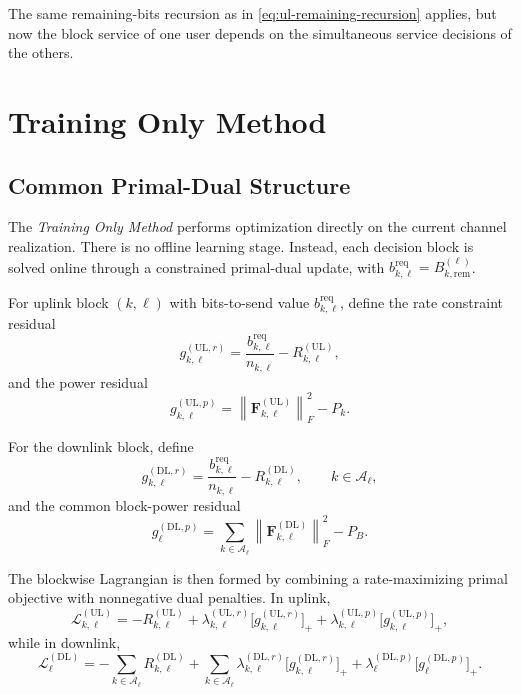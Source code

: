 \documentclass[11pt]{article}
\newcommand{\Aset}{\mathcal{A}}
\newcommand{\F}{\mathbf{F}}
\newcommand{\norm}[1]{\left\lVert #1 \right\rVert}
\newcommand{\UL}{\mathrm{UL}}
\newcommand{\DL}{\mathrm{DL}}
\begin{document}
The same remaining-bits recursion as in
\eqref{eq:ul-remaining-recursion} applies, but now the block service of one
user depends on the simultaneous service decisions of the others.

\section{Training Only Method}

\subsection{Common Primal-Dual Structure}

The \emph{Training Only Method} performs optimization directly on the current
channel realization. There is no offline learning stage. Instead, each decision
block is solved online through a constrained primal-dual update, with
$b_{k,\ell}^{\mathrm{req}} = B_{k,\mathrm{rem}}^{(\ell)}$.

For uplink block $(k,\ell)$ with bits-to-send value
$b_{k,\ell}^{\mathrm{req}}$, define the rate constraint residual
\begin{equation}
g_{k,\ell}^{(\UL,r)}
=
\frac{b_{k,\ell}^{\mathrm{req}}}{n_{k,\ell}} - R_{k,\ell}^{(\UL)},
\label{eq:ul-rate-residual}
\end{equation}
and the power residual
\begin{equation}
g_{k,\ell}^{(\UL,p)}
=
\norm{\F_{k,\ell}^{(\UL)}}_F^2 - P_k.
\label{eq:ul-power-residual}
\end{equation}

For the downlink block, define
\begin{equation}
g_{k,\ell}^{(\DL,r)}
=
\frac{b_{k,\ell}^{\mathrm{req}}}{n_{k,\ell}} - R_{k,\ell}^{(\DL)},
\qquad k\in\Aset_\ell,
\label{eq:dl-rate-residual}
\end{equation}
and the common block-power residual
\begin{equation}
g_{\ell}^{(\DL,p)}
=
\sum_{k\in\Aset_\ell}\norm{\F_{k,\ell}^{(\DL)}}_F^2 - P_B.
\label{eq:dl-power-residual}
\end{equation}

The blockwise Lagrangian is then formed by combining a rate-maximizing primal
objective with nonnegative dual penalties. In uplink,
\begin{equation}
\mathcal{L}_{k,\ell}^{(\UL)}
=
-R_{k,\ell}^{(\UL)}
+
\lambda_{k,\ell}^{(\UL,r)}\bigl[g_{k,\ell}^{(\UL,r)}\bigr]_+
+
\lambda_{k,\ell}^{(\UL,p)}\bigl[g_{k,\ell}^{(\UL,p)}\bigr]_+,
\label{eq:ul-lagrangian}
\end{equation}
while in downlink,
\begin{equation}
\mathcal{L}_{\ell}^{(\DL)}
=
-\sum_{k\in\Aset_\ell} R_{k,\ell}^{(\DL)}
+
\sum_{k\in\Aset_\ell}
\lambda_{k,\ell}^{(\DL,r)}\bigl[g_{k,\ell}^{(\DL,r)}\bigr]_+
+
\lambda_{\ell}^{(\DL,p)}\bigl[g_{\ell}^{(\DL,p)}\bigr]_+.
\label{eq:dl-lagrangian}
\end{equation}
\end{document}
